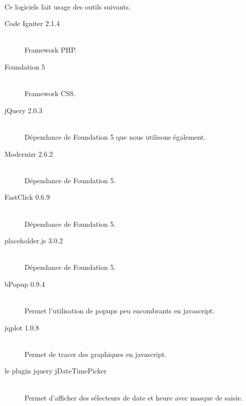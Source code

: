     \paragraph{}
        Ce logiciels fait usage des outils suivants.
        \begin{description}
            \item[Code Igniter 2.1.4]\hfill \\
                Framework PHP.
            \item[Foundation 5]\hfill \\
                Framework CSS.
            \item[jQuery 2.0.3]\hfill \\
                Dépendance de Foundation 5 que nous utilisons également.
            \item[Modernizr 2.6.2]\hfill \\
                Dépendance de Foundation 5.
            \item[FastClick 0.6.9]\hfill \\
                Dépendance de Foundation 5.
            \item[placeholder.js 3.0.2]\hfill \\
                Dépendance de Foundation 5.
            \item[bPopup 0.9.4]\hfill \\
                Permet l’utilisation de popups peu encombrants en javascript.
            \item[jqplot 1.0.8]\hfill \\
                Permet de tracer des graphiques en javascript.
            \item[le plugin jquery jDateTimePicker]\hfill \\
                Permet d'afficher des sélecteurs de date et heure avec masque
                de saisie.
        \end{description}